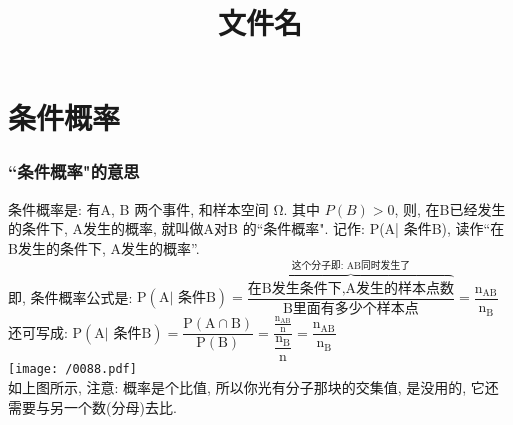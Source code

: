 \documentclass[UTF8]{ctexart}
\title{文件名}
\begin{document}
	\tableofcontents %
	\date{} %
	\maketitle  %
	
	
	
	\part{条件概率}
	
	\section{``条件概率"的意思}
	
	条件概率是: 有A, B 两个事件, 和样本空间 Ω. 其中 $P(B) >0$, 则, 在B已经发生的条件下, A发生的概率, 就叫做A对B 的``条件概率". 记作:  P(A| 条件B), 读作``在B发生的条件下, A发生的概率”. \\
	
	即, 条件概率公式是: $
	\text{P}\left( \text{A|\ 条件B} \right) =\dfrac{\overset{\text{这个分子即:\ AB同时发生了}}{\overbrace{\text{在B发生条件下,A发生的样本点数}}}}{\text{B里面有多少个样本点}}=\dfrac{\text{n}_{\text{AB}}}{\text{n}_{\text{B}}}
	$ \\
	
	还可写成:  $
	\text{P}\left( \text{A|\ 条件B} \right) 
	=\dfrac{\text{P}\left( \text{A}\cap \text{B} \right)}{\text{P}\left( \text{B} \right)}
	=\dfrac{\frac{\text{n}_{\text{AB}}}{\text{n}}}{\dfrac{\text{n}_{\text{B}}}{\text{n}}}=\dfrac{\text{n}_{\text{AB}}}{\text{n}_{\text{B}}}
		$ \\
	
	\texttt{[image: /0088.pdf]} \\
	
	如上图所示, 注意: 概率是个比值, 所以你光有分子那块的交集值, 是没用的, 它还需要与另一个数(分母)去比. \\
	
\end{document}
